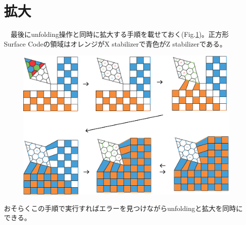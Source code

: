 \documentclass[a4paper,10pt]{ltjsarticle}
\begin{document}
\section{拡大}{
    　最後にunfolding操作と同時に拡大する手順を載せておく(Fig.\ref{figure13})。正方形Surface Codeの領域はオレンジがX stabilizerで青色がZ stabilizerである。

    \begin{figure}[h]
        \centering
        \includegraphics[scale=0.25]{figure/figure13.eps}
        \caption{ }
        \label{figure13}
    \end{figure}

    おそらくこの手順で実行すればエラーを見つけながらunfoldingと拡大を同時にできる。


}
\end{document}
